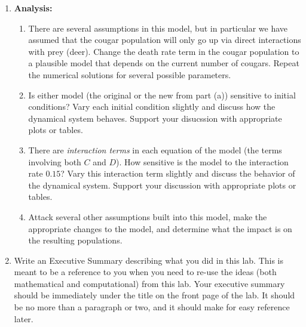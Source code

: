 \begin{problem}
\begin{enumerate}
    \item {\bf Analysis:} 
        \begin{enumerate}
            \item There are several assumptions in this model, but in particular we have
                assumed that the cougar population will only go up via direct interactions
                with prey (deer).  Change the death rate term in the cougar population to
                a plausible model that depends on the current number of cougars.  Repeat
                the numerical solutions for several possible parameters.
            \item Is either model (the original or the new from part (a)) sensitive to
                initial conditions?  Vary each initial condition slightly and discuss how
                the dynamical system behaves. Support your disucssion with appropriate
                plots or tables.
            \item There are {\it interaction terms} in each equation of the model (the
                terms involving both $C$ and $D$).  How sensitive is the model to the
                interaction rate $0.15$?  Vary this interaction term slightly and discuss
                the behavior of the dynamical system. Support your discussion with
                appropriate plots or tables.
            \item Attack several other assumptions built into this model, make the
                appropriate changes to the model, and determine what the impact is on the
                resulting populations.
        \end{enumerate}



    \item Write an Executive Summary describing what you did in this lab.  This is meant
        to be a reference to you when you need to re-use the ideas (both mathematical and
        computational) from this lab. Your executive summary should be immediately under
        the title on the front page of the lab.  It should be no more than a paragraph or
        two, and it should make for easy reference later.

\end{enumerate}
\end{problem}


